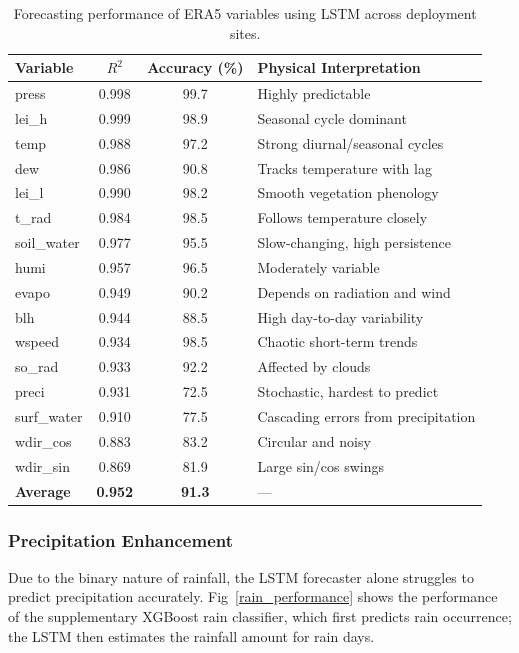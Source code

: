 \documentclass[12pt]{report}
\begin{document}
\begin{table}[h!]
\centering
\caption{Forecasting performance of ERA5 variables using LSTM across deployment sites.}
\vspace{.2cm}
\label{tab:era5_performance}
\begin{tabular}{|l|c|c|l|}
\hline
\textbf{Variable} & \textbf{$R^2$} & \textbf{Accuracy (\%)} & \textbf{Physical Interpretation} \\
\hline
press & 0.998 & 99.7 & Highly predictable \\
\hline
lei\_h & 0.999 & 98.9 & Seasonal cycle dominant \\
\hline
temp & 0.988 & 97.2 & Strong diurnal/seasonal cycles \\
\hline
dew & 0.986 & 90.8 & Tracks temperature with lag \\
\hline
lei\_l & 0.990 & 98.2 & Smooth vegetation phenology \\
\hline
t\_rad & 0.984 & 98.5 & Follows temperature closely \\
\hline
soil\_water & 0.977 & 95.5 & Slow-changing, high persistence \\
\hline
humi & 0.957 & 96.5 & Moderately variable \\
\hline
evapo & 0.949 & 90.2 & Depends on radiation and wind \\
\hline
blh & 0.944 & 88.5 & High day-to-day variability \\
\hline
wspeed & 0.934 & 98.5 & Chaotic short-term trends \\
\hline
so\_rad & 0.933 & 92.2 & Affected by clouds \\
\hline
preci & 0.931 & 72.5 & Stochastic, hardest to predict \\
\hline
surf\_water & 0.910 & 77.5 & Cascading errors from precipitation \\
\hline
wdir\_cos & 0.883 & 83.2 & Circular and noisy \\
\hline
wdir\_sin & 0.869 & 81.9 & Large sin/cos swings \\
\hline
\textbf{Average} & \textbf{0.952} & \textbf{91.3} & --- \\
\hline
\end{tabular}
\end{table}

\subsubsection{Precipitation Enhancement}

Due to the binary nature of rainfall, the LSTM forecaster alone struggles to predict precipitation accurately. Fig~\ref{rain_performance} shows the performance of the supplementary XGBoost rain classifier, which first predicts rain occurrence; the LSTM then estimates the rainfall amount for rain days.
\end{document}
